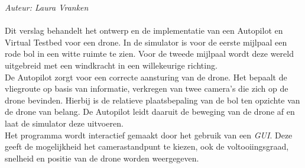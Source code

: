 \noindent
{\em Auteur: Laura Vranken }\\
\\
Dit verslag behandelt het ontwerp en de implementatie van een Autopilot en Virtual Testbed voor een drone. In de simulator is voor de eerste mijlpaal een rode bol in een witte ruimte te zien. Voor de tweede mijlpaal wordt deze wereld uitgebreid met een windkracht in een willekeurige richting.
\\
De Autopilot zorgt voor een correcte aansturing van de drone. Het bepaalt de vliegroute op basis van informatie, verkregen van twee camera's die zich op de drone bevinden. Hierbij is de relatieve plaatsbepaling van de bol ten opzichte van de drone van belang. De Autopilot leidt daaruit de beweging van de drone af en laat de simulator deze uitvoeren.
\\
Het programma wordt interactief gemaakt door het gebruik van een \textit{GUI}. Deze geeft de mogelijkheid het camerastandpunt te kiezen, ook de voltooiingsgraad, snelheid en positie van de drone worden weergegeven.